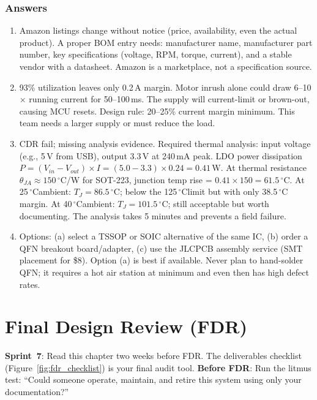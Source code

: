 \documentclass[11pt,letterpaper,twoside,openany]{book}
\newcommand{\degC}{\ensuremath{{}^{\circ}\text{C}}}
\begin{document}
\subsection{Answers}
\begin{enumerate}[leftmargin=1.5em]
\item Amazon listings change without notice (price, availability, even the actual product). A proper BOM entry needs: manufacturer name, manufacturer part number, key specifications (voltage, RPM, torque, current), and a stable vendor with a datasheet. Amazon is a marketplace, not a specification source.
\item 93\% utilization leaves only 0.2\,A margin. Motor inrush alone could draw 6--10$\times$ running current for 50--100\,ms. The supply will current-limit or brown-out, causing MCU resets. Design rule: 20--25\% current margin minimum. This team needs a larger supply or must reduce the load.

\item CDR fail; missing analysis evidence. Required thermal analysis: input voltage (e.g., 5\,V from USB), output 3.3\,V at 240\,mA peak. LDO power dissipation $P = (V_{in} - V_{out}) \times I = (5.0 - 3.3) \times 0.24 = 0.41$\,W. At thermal resistance $\theta_{JA} \approx 150$\,\degC/W for SOT-223, junction temp rise = $0.41 \times 150 = 61.5$\,\degC. At 25\,\degC ambient: $T_J = 86.5$\,\degC; below the 125\,\degC limit but with only 38.5\,\degC margin. At 40\,\degC ambient: $T_J = 101.5$\,\degC; still acceptable but worth documenting. The analysis takes 5 minutes and prevents a field failure.
\item Options: (a) select a TSSOP or SOIC alternative of the same IC, (b) order a QFN breakout board/adapter, (c) use the JLCPCB assembly service (SMT placement for \$8). Option (a) is best if available. Never plan to hand-solder QFN; it requires a hot air station at minimum and even then has high defect rates.
\end{enumerate}


\chapter{Final Design Review (FDR)}\label{ch:fdr}

\begin{tipbox}
\textbf{Sprint~7}: Read this chapter two weeks before FDR. The deliverables checklist (Figure~\ref{fig:fdr_checklist}) is your final audit tool. \textbf{Before FDR}: Run the litmus test: ``Could someone operate, maintain, and retire this system using only your documentation?''
\end{tipbox}
\end{document}
